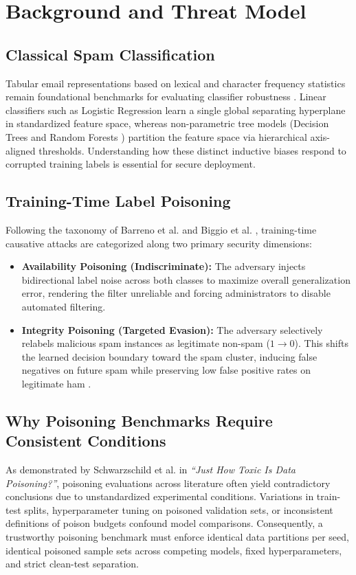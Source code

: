 \documentclass[10pt,conference]{IEEEtran}
\begin{document}
\section{Background and Threat Model}

\subsection{Classical Spam Classification}
Tabular email representations based on lexical and character frequency statistics remain foundational benchmarks for evaluating classifier robustness \cite{hopkins1999spambase}. Linear classifiers such as Logistic Regression learn a single global separating hyperplane in standardized feature space, whereas non-parametric tree models (Decision Trees and Random Forests \cite{breiman2001random}) partition the feature space via hierarchical axis-aligned thresholds. Understanding how these distinct inductive biases respond to corrupted training labels is essential for secure deployment.

\subsection{Training-Time Label Poisoning}
Following the taxonomy of Barreno et al. \cite{barreno2010security} and Biggio et al. \cite{biggio2012poisoning}, training-time causative attacks are categorized along two primary security dimensions:
\begin{itemize}
    \item \textbf{Availability Poisoning (Indiscriminate):} The adversary injects bidirectional label noise across both classes to maximize overall generalization error, rendering the filter unreliable and forcing administrators to disable automated filtering.
    \item \textbf{Integrity Poisoning (Targeted Evasion):} The adversary selectively relabels malicious spam instances as legitimate non-spam ($1 \to 0$). This shifts the learned decision boundary toward the spam cluster, inducing false negatives on future spam while preserving low false positive rates on legitimate ham \cite{nelson2008exploiting, xiao2015feature}.
\end{itemize}

\subsection{Why Poisoning Benchmarks Require Consistent Conditions}
As demonstrated by Schwarzschild et al. \cite{schwarzschild2021just} in \textit{``Just How Toxic Is Data Poisoning?''}, poisoning evaluations across literature often yield contradictory conclusions due to unstandardized experimental conditions. Variations in train-test splits, hyperparameter tuning on poisoned validation sets, or inconsistent definitions of poison budgets confound model comparisons. Consequently, a trustworthy poisoning benchmark must enforce identical data partitions per seed, identical poisoned sample sets across competing models, fixed hyperparameters, and strict clean-test separation.
\end{document}
